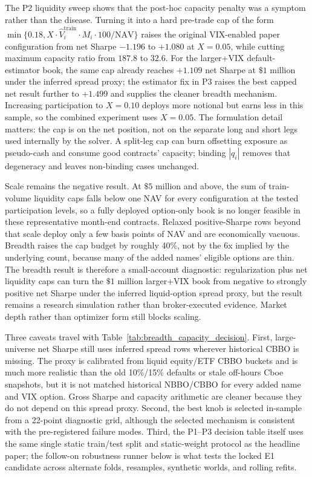 The P2 liquidity sweep shows that the post-hoc capacity penalty was a symptom rather than
the disease. Turning it into a hard pre-trade cap of the form
\(\min\{0.18,X\cdot\widehat V_i^{\mathrm{train}}\cdot M_i\cdot100/\mathrm{NAV}\}\)
raises the original VIX-enabled paper configuration from net Sharpe \(-1.196\) to
\(+1.080\) at \(X=0.05\), while cutting maximum capacity ratio from \(187.8\) to \(32.6\).
For the larger+VIX default-estimator book, the same cap already reaches \(+1.109\) net
Sharpe at \(\$1\) million under the inferred spread proxy; the estimator fix in P3
raises the best capped net result further to \(+1.499\) and supplies the cleaner breadth
mechanism. Increasing
participation to \(X=0.10\) deploys more notional but earns less in this sample, so the
combined experiment uses \(X=0.05\). The formulation detail matters:
the cap is on the net position, not on the separate long and short legs used internally by
the solver. A split-leg cap can burn offsetting exposure as pseudo-cash and consume good
contracts' capacity; binding \(|q_i|\) removes that degeneracy and leaves non-binding
cases unchanged.

Scale remains the negative result. At \(\$5\) million and above, the sum of train-volume
liquidity caps falls below one NAV for every configuration at the tested participation
levels, so a fully deployed option-only book is no longer feasible in these representative
month-end contracts. Relaxed positive-Sharpe rows beyond that scale deploy only a few
basis points of NAV and are economically vacuous. Breadth raises the cap budget by roughly
40\%, not by the 6x implied by the underlying count, because many of the added names'
eligible options are thin. The breadth result is therefore a small-account diagnostic:
regularization plus net liquidity caps can turn the \(\$1\) million larger+VIX book from
negative to strongly positive net Sharpe under the inferred liquid-option spread proxy,
but the result remains a research simulation rather than broker-executed evidence. Market
depth rather than optimizer form still blocks scaling.

Three caveats travel with Table~\ref{tab:breadth_capacity_decision}. First, large-universe
net Sharpe still uses inferred spread rows wherever historical CBBO is missing. The proxy
is calibrated from liquid equity/ETF CBBO buckets and is much more realistic than the old
10\%/15\% defaults or stale off-hours Cboe snapshots, but it is not matched historical
NBBO/CBBO for every added name and VIX option. Gross Sharpe and capacity arithmetic are
cleaner because they do not depend on this spread proxy. Second, the best
knob is selected in-sample
from a 22-point diagnostic grid, although the selected mechanism is consistent with the
pre-registered failure modes. Third, the P1--P3 decision table itself uses the same single
static train/test split and static-weight protocol as the headline paper; the follow-on
robustness runner below is what tests the locked E1 candidate across alternate folds,
resamples, synthetic worlds, and rolling refits.

